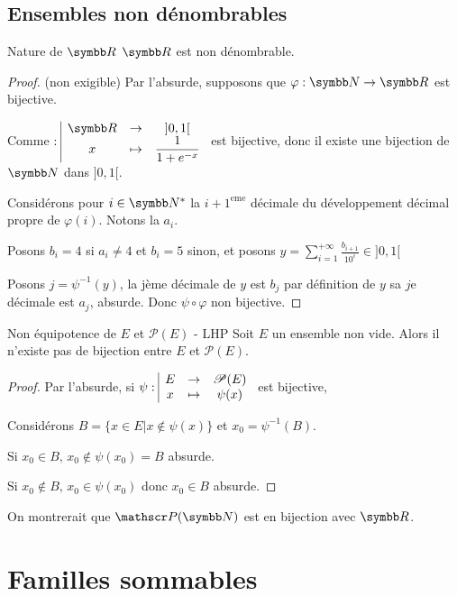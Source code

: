 \subsection{Ensembles non dénombrables}

\begin{theoreme}{Nature de $\R$}{}
    $\R$ est non dénombrable.
\end{theoreme}

\begin{proof} (non exigible)
    Par l'absurde, supposons que $\varphi : \N \to \R$ est bijective. 

    Comme $\fonction{} \R {]0, 1[} x {\frac 1 {1 + e^{- x}}}$ est bijective, donc 
    il existe une bijection de $\N$ dans $]0, 1[$.

    Considérons pour $i \in \N^*$ la $i + 1^{\text{eme}}$ décimale du développement décimal 
    propre de $\varphi(i)$. Notons la $a_i$. 

    Posons $b_i = 4$ si $a_i \neq 4$ et $b_i = 5$ sinon, et posons $\displaystyle y = \sum_{i = 1}^{+ \infty} \frac{b_{i + 1}}{10^i} \in ]0, 1[$ 

    Posons $j = \psi^{-1}(y)$,
    la jème décimale de $y$ est $b_j$ par définition de $y$ sa $j$e décimale est 
    $a_j$, absurde. Donc $\psi \circ \varphi$ non bijective.
\end{proof}

\begin{theoreme}{Non équipotence de $E$ et $\mathscr P(E)$ - LHP}{}
    Soit $E$ un ensemble non vide. Alors il n'existe pas de bijection entre $E$ et $\mathscr P(E)$.
\end{theoreme}

\begin{proof}
    Par l'absurde, si $\psi: \space \begin{array}{|ccc} \displaystyle E & \to & \displaystyle \mathscr P(E) \\ \displaystyle x & \mapsto & \displaystyle \psi(x) \end{array}$ est bijective,

    Considérons $B = \{ x \in E | x \notin \psi(x) \} $ et $x_0 = \psi^{-1}(B)$.

    Si $x_0 \in B, \, x_0 \notin \psi(x_0) = B$ absurde.

    Si $x_0 \notin B, \, x_0 \in \psi(x_0)$ donc $x_0 \in B$ absurde. 
\end{proof}

\begin{remarque}
    On montrerait que $\mathscr P(\N)$ est en bijection avec $\R$.
\end{remarque}

\section{Familles sommables}
